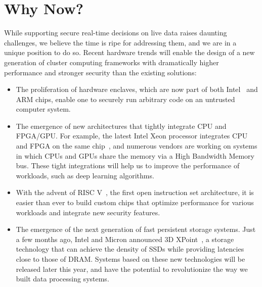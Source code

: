 \section{Why Now?}

While supporting secure real-time decisions on live data raises daunting challenges, we believe the time is ripe for addressing them, and we are in a unique position to do so. Recent hardware trends will enable the design of a new generation of cluster computing frameworks with dramatically higher performance and stronger security than the existing solutions: 

\begin{itemize}[noitemsep,topsep=0pt,parsep=0pt,partopsep=0pt]
\item The proliferation of hardware enclaves, which are now part of both Intel~\cite{IntelSGX} and ARM chips, enable one to securely run arbitrary code on an untrusted computer system.

\item The emergence of new architectures that tightly integrate CPU and FPGA/GPU. For example, the latest Intel Xeon processor integrates CPU and FPGA on the same chip~\cite{Intel-fpga}, and numerous vendors are working on systems in which  CPUs and GPUs share the memory via a High Bandwidth Memory bus. These tight integrations will help us to improve the performance of workloads, such as deep learning algorithms.

\item With the advent of RISC V~\cite{risc-v}, the first open instruction set architecture, it is easier than ever to build custom chips that optimize performance for various workloads and integrate new security features.

\item The emergence of the next generation of fast persistent storage systems. Just a few months ago, Intel and Micron announced 3D XPoint~\cite{3d-xpoint}, a storage technology that can achieve the density of SSDs while providing latencies close to those of DRAM. Systems based on these new technologies will be released later this year, and have the potential to revolutionize the way we built data processing systems.
\end{itemize}

